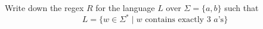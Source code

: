 Write down the regex $R$ for the language $L$ over $\Sigma = \{a, b\}$ 
such that 
\[
L = \{w \in \Sigma^* \mid w \text{ contains exactly 3 $a$'s} \}
\]
